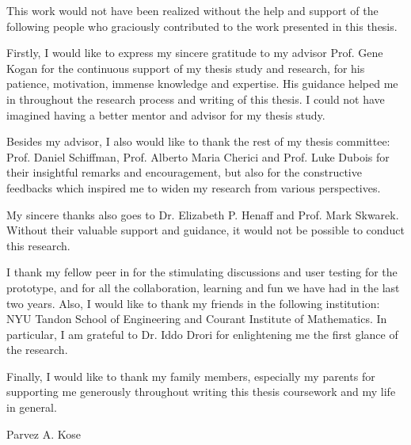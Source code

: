 %
%
%
%
%

\begin{acknowledgments} 

This work would not have been realized without the help and support of the following people who graciously contributed to the work presented in this thesis.

Firstly, I would like to express my sincere gratitude to my advisor Prof. Gene Kogan for the continuous support of my thesis study and research, for his patience, motivation, immense knowledge and expertise. His guidance helped me in throughout the research process and writing of this thesis. I could not have imagined having a better mentor and advisor for my thesis study.

Besides my advisor, I also would like to thank the rest of my thesis committee: Prof. Daniel Schiffman, Prof. Alberto Maria Cherici and Prof. Luke Dubois for their insightful remarks and encouragement, but also for the constructive feedbacks which inspired me to widen my research from various perspectives.

My sincere thanks also goes to Dr. Elizabeth P. Henaff and Prof. Mark Skwarek. Without their valuable support and guidance, it would not be possible to conduct this research.

I thank my fellow peer in for the stimulating discussions and user testing for the prototype, and for all the collaboration, learning and fun we have had in the last two years. Also, I would like to thank my friends in the following institution: NYU Tandon School of Engineering and Courant Institute of Mathematics. In particular, I am grateful to Dr. Iddo Drori for enlightening me the first glance of the research.

Finally, I would like to thank my family members, especially my parents for supporting me generously throughout writing this thesis coursework and my life in general.

\begin{flushright} 
Parvez A. Kose
\end{flushright}
\end{acknowledgments}

